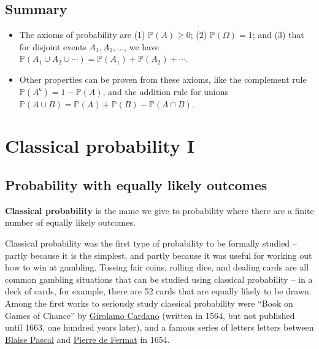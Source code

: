 \documentclass[
  a4paper,
]{book}
\providecommand{\tightlist}{%
  \setlength{\itemsep}{0pt}\setlength{\parskip}{0pt}}
\theoremstyle{definition}
\theoremstyle{definition}
\theoremstyle{definition}
\theoremstyle{definition}
\theoremstyle{remark}
\begin{document}
\hypertarget{summary-L04}{%
\section*{Summary}\label{summary-L04}}

\begin{itemize}
\tightlist
\item
  The axioms of probability are (1) \(\mathbb P(A) \geq 0\); (2) \(\mathbb P(\Omega) = 1\); and (3) that for disjoint events \(A_1, A_2, \dots\), we have \(\mathbb P(A_1 \cup A_2 \cup \cdots) = \mathbb P(A_1) + \mathbb P(A_2) + \cdots\).
\item
  Other properties can be proven from these axioms, like the complement rule \(\mathbb P(A^\mathsf{c}) = 1 - \mathbb P(A)\), and the addition rule for unions \(\mathbb P(A \cup B) = \mathbb P(A) + \mathbb P(B) - \mathbb P(A \cap B)\).
\end{itemize}

\hypertarget{L05-classical-i}{%
\chapter{Classical probability I}\label{L05-classical-i}}

\hypertarget{classical-intro}{%
\section{Probability with equally likely outcomes}\label{classical-intro}}

\textbf{Classical probability} is the name we give to probability where there are a finite number of equally likely outcomes.

Classical probability was the first type of probability to be formally studied -- partly because it is the simplest, and partly because it was useful for working out how to win at gambling. Tossing fair coins, rolling dice, and dealing cards are all common gambling situations that can be studied using classical probability -- in a deck of cards, for example, there are 52 cards that are equally likely to be drawn. Among the first works to seriously study classical probability were ``Book on Games of Chance'' by \href{https://mathshistory.st-andrews.ac.uk/Biographies/Cardan/}{Girolamo Cardano} (written in 1564, but not published until 1663, one hundred years later), and a famous series of letters letters between \href{https://mathshistory.st-andrews.ac.uk/Biographies/Pascal/}{Blaise Pascal} and \href{https://mathshistory.st-andrews.ac.uk/Biographies/Fermat/}{Pierre de Fermat} in 1654.
\end{document}
